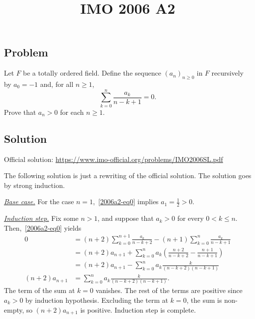 \documentclass{article}
\title{IMO 2006 A2}
\author{}
\date{}
\begin{document}
\maketitle



\subsection*{Problem}

Let $F$ be a totally ordered field.
Define the sequence $(a_n)_{n \geq 0}$ in $F$ recursively by $a_0 = -1$ and, for all $n \geq 1$,
\[ \sum_{k = 0}^n \frac{a_k}{n - k + 1} = 0. \tag{*}\label{2006a2-eq0} \]
Prove that $a_n > 0$ for each $n \geq 1$.



\subsection*{Solution}

Official solution: \url{https://www.imo-official.org/problems/IMO2006SL.pdf}

The following solution is just a rewriting of the official solution.
The solution goes by strong induction.

\textit{\underline{Base case.}}
For the case $n = 1$,~\eqref{2006a2-eq0} implies $a_1 = \frac{1}{2} > 0$.

\textit{\underline{Induction step.}}
Fix some $n > 1$, and suppose that $a_k > 0$ for every $0 < k \leq n$.
Then,~\eqref{2006a2-eq0} yields
\begin{align*}
    0
    &= (n + 2) \sum_{k = 0}^{n + 1} \frac{a_k}{n - k + 2} - (n + 1) \sum_{k = 0}^n \frac{a_k}{n - k + 1} \\
    &= (n + 2) a_{n + 1} + \sum_{k = 0}^n a_k \left(\frac{n + 2}{n - k + 2} - \frac{n + 1}{n - k + 1}\right) \\
    &= (n + 2) a_{n + 1} - \sum_{k = 0}^n a_k \frac{k}{(n - k + 2)(n - k + 1)} \\
(n + 2) a_{n + 1}
    &= \sum_{k = 0}^n a_k \frac{k}{(n - k + 2)(n - k + 1)}.
\end{align*}
The term of the sum at $k = 0$ vanishes.
The rest of the terms are positive since $a_k > 0$ by induction hypothesis.
Excluding the term at $k = 0$, the sum is non-empty, so $(n + 2) a_{n + 1}$ is positive.
Induction step is complete.
\end{document}
